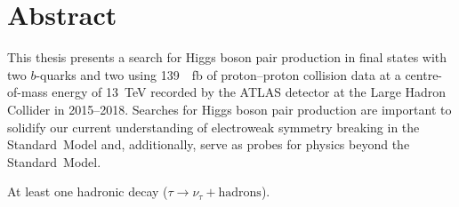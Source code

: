 \chapter*{Abstract}

This thesis presents a search for Higgs boson pair production in final states
with two $b$-quarks and two \tauleptons using \SI{139}{\per\femto\barn} of
proton--proton collision data at a centre-of-mass energy of \SI{13}{\TeV}
recorded by the ATLAS detector at the Large Hadron Collider in 2015--2018.
Searches for Higgs boson pair production are important to solidify our current
understanding of electroweak symmetry breaking in the Standard~Model and,
additionally, serve as probes for physics beyond the Standard~Model.

At least one hadronic \taulepton decay ($\tau \to \nu_{\tau} + \text{hadrons}$).












%


%


